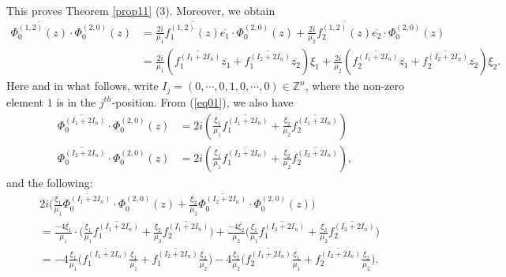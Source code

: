 \documentclass[12pt]{article}
\numberwithin{equation}{section}
\def\ZZ{{\mathbb Z}}
\def\ov{\overline}
\begin{document}
This proves Theorem \ref{prop11} (3).  Moreover,  we obtain
\begin{equation}\begin{split}\label{eq01}
\ov{\Phi_0^{(1,2)}(z)}\cdot
\Phi_0^{(2,0)}(z)&=\frac{2i}{\mu_1}\ov{f_1^{(1,2)}(z)}\ov{e_1}\cdot
\Phi_0^{(2,0)}(z)
     +\frac{2i}{\mu_2}\ov{f_2^{(1,2)}(z)}\ov{e_2}\cdot
\Phi_0^{(2,0)}(z)\\
&=\frac{2i}{\mu_1}(\ov{f_1^{(I_1+2I_n)}}\ov{z_1}+\ov{f_1^{(I_2+2I_n)}}\ov{z_2})\xi_1
     +\frac{2i}{\mu_2}(\ov{f_2^{(I_1+2I_n)}}\ov{z_1}+\ov{f_2^{(I_2+2I_n)}}\ov{z_2})\xi_2.
\end{split}\end{equation}
{Here and in} what follows, write $I_j=(0,\cdots, 0,
1,0,\cdots,0)\in {\ZZ}^n$, where the non-zero element $1$ is in the
$j^{th}$-position. From (\ref{eq01}), we also have
\begin{equation}\begin{split}\label {eq2}
\ov{\Phi_0^{(I_1+2I_n)}}\cdot
\Phi_0^{(2,0)}(z)&=2i(\frac{\xi_1}{\mu_1}\ov{f_1^{(I_1+2I_n)}}+\frac{\xi_2}{\mu_2}\ov{f_2^{(I_1+2I_n)}})\\
\ov{\Phi_0^{(I_2+2I_n)}}\cdot
\Phi_0^{(2,0)}(z)&=2i(\frac{\xi_1}{\mu_1}\ov{f_1^{(I_2+2I_n)}}+\frac{\xi_2}{\mu_2}\ov{f_2^{(I_2+2I_n)}}),
\end{split}\end{equation}
and the following:
\begin{equation}\begin{split}\label{97eq1}
&2i\big(\frac{\ov{\xi_1}}{\mu_1}\ov{\Phi_0^{(I_1+2I_n)}}\cdot
\Phi_0^{(2,0)}(z)+\frac{\ov{\xi_2}}{\mu_2}\ov{\Phi_0^{(I_2+2I_n)}}\cdot\Phi_0^{(2,0)}(z)\big)\\
&=\frac{-4\ov{\xi_1}}{\mu_1}\cdot\big(\frac{\xi_1}{\mu_1}\ov{f_1^{(I_1+2I_n)}}
+\frac{\xi_2}{\mu_2}\ov{f_2^{(I_1+2I_n)}}\big)
+\frac{-4\ov{\xi_2}}{\mu_2}\big(\frac{\xi_1}{\mu_1}\ov{f_1^{(I_2+2I_n)}}+\frac{\xi_2}{\mu_2}\ov{f_2^{(I_2+2I_n)}}\big)\\
&=-4\frac{\xi_1}{\mu_1}
   \big(\ov{f_{1}^{(I_1+2I_n)}}\frac{\ov{\xi_1}}{\mu_1}+\ov{f_{1}^{(I_2+2I_n)}}\frac{\ov{\xi_2}}{\mu_2}\big)
   -4\frac{\xi_2}{\mu_2}
   \big(\ov{f_{2}^{(I_1+2I_n)}}\frac{\ov{\xi_1}}{\mu_1}+\ov{f_{2}^{(I_2+2I_n)}}\frac{\ov{\xi}_2}{\mu_2}\big).
\end{split}\end{equation}
\end{document}
